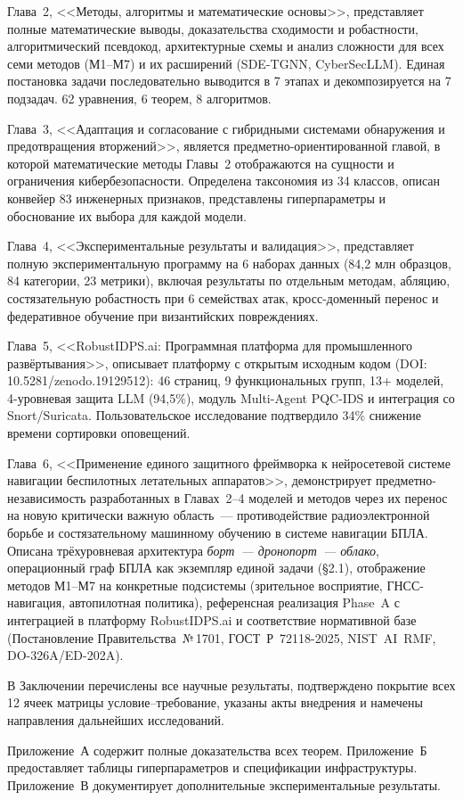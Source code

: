 Глава~2, <<Методы, алгоритмы и математические основы>>, представляет полные математические выводы, доказательства сходимости и робастности, алгоритмический псевдокод, архитектурные схемы и анализ сложности для всех семи методов (М1--М7) и их расширений (SDE-TGNN, CyberSecLLM). Единая постановка задачи последовательно выводится в 7 этапах и декомпозируется на 7 подзадач. 62 уравнения, 6 теорем, 8 алгоритмов.

Глава~3, <<Адаптация и согласование с гибридными системами обнаружения и предотвращения вторжений>>, является предметно-ориентированной главой, в которой математические методы Главы~2 отображаются на сущности и ограничения кибербезопасности. Определена таксономия из 34 классов, описан конвейер 83 инженерных признаков, представлены гиперпараметры и обоснование их выбора для каждой модели.

Глава~4, <<Экспериментальные результаты и валидация>>, представляет полную экспериментальную программу на 6 наборах данных (84,2 млн образцов, 84 категории, 23 метрики), включая результаты по отдельным методам, абляцию, состязательную робастность при 6 семействах атак, кросс-доменный перенос и федеративное обучение при византийских повреждениях.

Глава~5, <<RobustIDPS.ai: Программная платформа для промышленного развёртывания>>, описывает платформу с открытым исходным кодом (DOI: 10.5281/zenodo.19129512): 46 страниц, 9 функциональных групп, 13+ моделей, 4-уровневая защита LLM (94,5\%), модуль Multi-Agent PQC-IDS и интеграция со Snort/Suricata. Пользовательское исследование подтвердило 34\% снижение времени сортировки оповещений.

Глава~6, <<Применение единого защитного фреймворка к нейросетевой системе навигации беспилотных летательных аппаратов>>, демонстрирует предметно-независимость разработанных в Главах~2--4 моделей и методов через их перенос на новую критически важную область~--- противодействие радиоэлектронной борьбе и состязательному машинному обучению в системе навигации БПЛА. Описана трёхуровневая архитектура \emph{борт~--- дронопорт~--- облако}, операционный граф БПЛА как экземпляр единой задачи (\S2.1), отображение методов \textsf{М1}--\textsf{М7} на конкретные подсистемы (зрительное восприятие, ГНСС-навигация, автопилотная политика), референсная реализация Phase~A с интеграцией в платформу \textsf{RobustIDPS.ai} и соответствие нормативной базе (Постановление Правительства~№\,1701, \mbox{ГОСТ~Р~72118-2025}, \mbox{NIST~AI~RMF}, \mbox{DO-326A/ED-202A}).

В Заключении перечислены все научные результаты, подтверждено покрытие всех 12 ячеек матрицы условие--требование, указаны акты внедрения и намечены направления дальнейших исследований.

Приложение~А содержит полные доказательства всех теорем. Приложение~Б предоставляет таблицы гиперпараметров и спецификации инфраструктуры. Приложение~В документирует дополнительные экспериментальные результаты.
